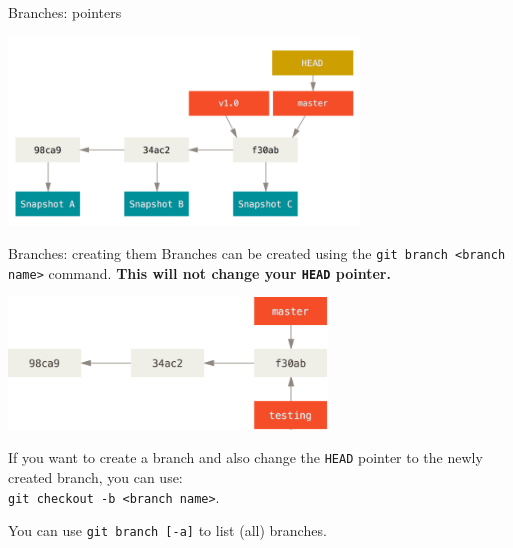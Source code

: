 \documentclass{beeper}
\begin{document}
\begin{frame}{Branches: pointers}


    \begin{center}
        \includegraphics[height=50mm]{graphics/branching1}
    \end{center}
\end{frame}

\begin{frame}{Branches: creating them}
    Branches can be created using the \texttt{git branch <branch name>} command.
    \textbf{This will not change your \texttt{HEAD} pointer.}

    \begin{center}
        \includegraphics[height=35mm]{graphics/branching-creating}
    \end{center}

    If you want to create a branch and also change the \texttt{HEAD} pointer to
    the newly created branch, you can use:\\
    \texttt{git checkout -b <branch name>}.
    \pause

    You can use \texttt{git branch [-a]} to list (all) branches.
\end{frame}
\end{document}
